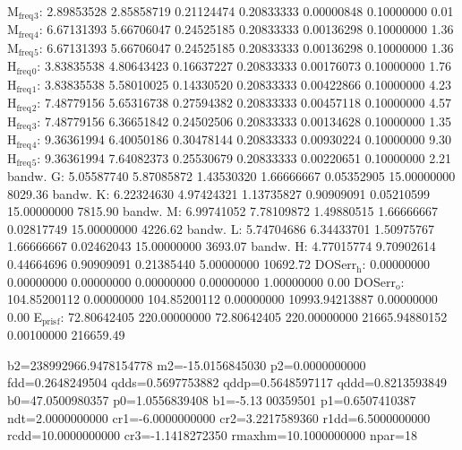 \documentclass[11pt]{article}
\begin{document}
M\(_{\text{freq}}\)\(_{\text{3}}\):   2.89853528   2.85858719   0.21124474   0.20833333   0.00000848   0.10000000         0.01
M\(_{\text{freq}}\)\(_{\text{4}}\):   6.67131393   5.66706047   0.24525185   0.20833333   0.00136298   0.10000000         1.36
M\(_{\text{freq}}\)\(_{\text{5}}\):   6.67131393   5.66706047   0.24525185   0.20833333   0.00136298   0.10000000         1.36
H\(_{\text{freq}}\)\(_{\text{0}}\):   3.83835538   4.80643423   0.16637227   0.20833333   0.00176073   0.10000000         1.76
H\(_{\text{freq}}\)\(_{\text{1}}\):   3.83835538   5.58010025   0.14330520   0.20833333   0.00422866   0.10000000         4.23
H\(_{\text{freq}}\)\(_{\text{2}}\):   7.48779156   5.65316738   0.27594382   0.20833333   0.00457118   0.10000000         4.57
H\(_{\text{freq}}\)\(_{\text{3}}\):   7.48779156   6.36651842   0.24502506   0.20833333   0.00134628   0.10000000         1.35
H\(_{\text{freq}}\)\(_{\text{4}}\):   9.36361994   6.40050186   0.30478144   0.20833333   0.00930224   0.10000000         9.30
H\(_{\text{freq}}\)\(_{\text{5}}\):   9.36361994   7.64082373   0.25530679   0.20833333   0.00220651   0.10000000         2.21
bandw. G:   5.05587740   5.87085872   1.43530320   1.66666667   0.05352905  15.00000000      8029.36
bandw. K:   6.22324630   4.97424321   1.13735827   0.90909091   0.05210599  15.00000000      7815.90
bandw. M:   6.99741052   7.78109872   1.49880515   1.66666667   0.02817749  15.00000000      4226.62
bandw. L:   5.74704686   6.34433701   1.50975767   1.66666667   0.02462043  15.00000000      3693.07
bandw. H:   4.77015774   9.70902614   0.44664696   0.90909091   0.21385440   5.00000000     10692.72
DOSerr\(_{\text{h}}\):   0.00000000   0.00000000   0.00000000   0.00000000   0.00000000   1.00000000         0.00
DOSerr\(_{\text{o}}\): 104.85200112   0.00000000 104.85200112   0.00000000 10993.94213887   0.00000000         0.00
E\(_{\text{pris}}\)\(_{\text{f}}\):  72.80642405 220.00000000  72.80642405 220.00000000 21665.94880152   0.00100000    216659.49

  b2=238992966.9478154778 m2=-15.0156845030 p2=0.0000000000 fdd=0.2648249504 qdds=0.5697753882 qddp=0.5648597117 qddd=0.8213593849 b0=47.0500980357 p0=1.0556839408 b1=-5.13
00359501 p1=0.6507410387 ndt=2.0000000000 cr1=-6.0000000000 cr2=3.2217589360 r1dd=6.5000000000 rcdd=10.0000000000 cr3=-1.1418272350 rmaxhm=10.1000000000 npar=18 
\end{document}
